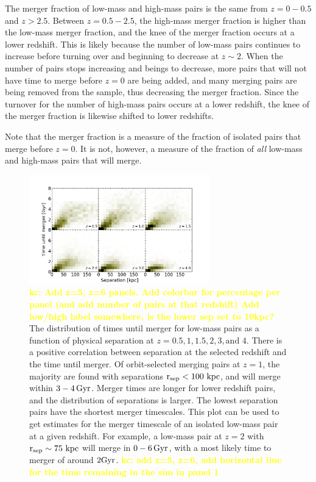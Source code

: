 \documentclass[twocolumn,linenumbers]{aastex631}
\newcommand{\kc}[1]{\textcolor{yellow}{\textbf{kc: #1}} }
\newcommand{\rsep}{\ensuremath{\rm r_{sep}}}
\begin{document}
The merger fraction of low-mass and high-mass pairs is the same from $z=0-0.5$ and $z>2.5$. 
Between $z=0.5-2.5$, the high-mass merger fraction is higher than the low-mass merger fraction, and the knee of the merger fraction occurs at a lower redshift.
This is likely because the number of low-mass pairs continues to increase before turning over and beginning to decrease at $z\sim2$.
When the number of pairs stops increasing and beings to decrease, more pairs that will not have time to merge before $z=0$ are being added, and many merging pairs are being removed from the sample, thus decreasing the merger fraction. 
Since the turnover for the number of high-mass pairs occurs at a lower redshift, the knee of the merger fraction is likewise shifted to lower redshifts.

Note that the merger fraction is a measure of the fraction of isolated pairs that merge before $z=0$. 
It is not, however, a measure of the fraction of \textit{all} low-mass and high-mass pairs that will merge. 




\begin{figure}[htb]
    \begin{center}
    \includegraphics[width=0.7\textwidth]{plots/bet-on-it/3_Timevsseplow-2d.png}
    \caption{\kc{Add z=5, z=6 panels. Add colorbar for percentage per panel (and add number of pairs at that redshift) Add low/high label somewhere, is the lower sep set to 10kpc?} The distribution of times until merger for low-mass pairs as a function of physical separation at $z=0.5,1,1.5,2,3,\mbox{and }4$. 
    There is a positive correlation between separation at the selected redshift and the time until merger. 
    Of orbit-selected merging pairs at $z=1$, the majority are found with separations $\rsep<100\,\kpc$, and will merge within $3-4\, \mathrm{Gyr}$. 
    Merger times are longer for lower redshift pairs, and the distribution of separations is larger.
    The lowest separation pairs have the shortest merger timescales.
    This plot can be used to get estimates for the merger timescale of an isolated low-mass pair at a given redshift. For example, a low-mass pair at $z=2$ with $\rsep\sim 75\,\kpc$ will merge in $0-6\,\mathrm{Gyr}$, with a most likely time to merger of around $2\mathrm{Gyr}$.
    \kc{add z=5, z=6, add horizontal line for the time remaining in the sim in panel 1}
    }
    \label{fig:timevssep-low}
    \end{center}
\end{figure}
\end{document}
